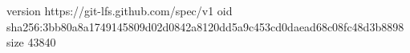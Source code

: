 version https://git-lfs.github.com/spec/v1
oid sha256:3bb80a8a1749145809d02d0842a8120dd5a9c453cd0daead68c08fc48d3b8898
size 43840
